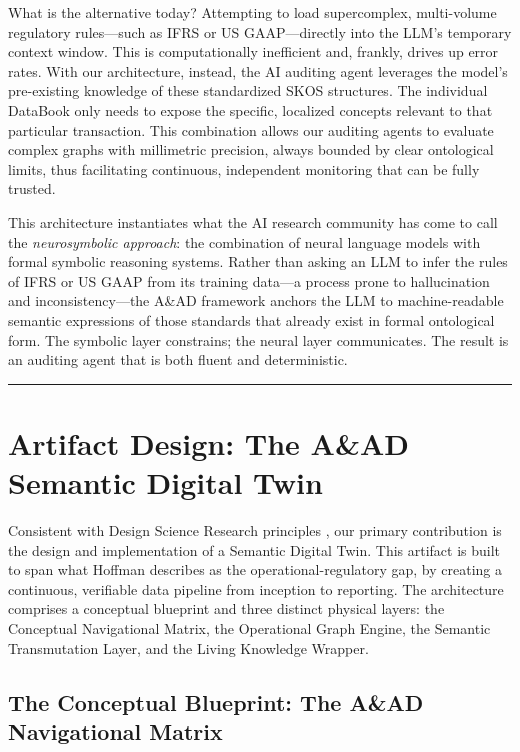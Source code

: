 \documentclass[12pt, a4paper]{article}
\begin{document}
What is the alternative today? Attempting to load supercomplex, multi-volume regulatory rules---such as IFRS or US GAAP---directly into the LLM's temporary context window. This is computationally inefficient and, frankly, drives up error rates. With our architecture, instead, the AI auditing agent leverages the model's pre-existing knowledge of these standardized SKOS structures. The individual DataBook only needs to expose the specific, localized concepts relevant to that particular transaction. This combination allows our auditing agents to evaluate complex graphs with millimetric precision, always bounded by clear ontological limits, thus facilitating continuous, independent monitoring that can be fully trusted.

This architecture instantiates what the AI research community has come to call the \textit{neurosymbolic approach}: the combination of neural language models with formal symbolic reasoning systems. Rather than asking an LLM to infer the rules of IFRS or US GAAP from its training data---a process prone to hallucination and inconsistency---the A\&AD framework anchors the LLM to machine-readable semantic expressions of those standards that already exist in formal ontological form. The symbolic layer constrains; the neural layer communicates. The result is an auditing agent that is both fluent and deterministic.

\hrule
\vspace{1em}

\section{Artifact Design: The A\&AD Semantic Digital Twin}

Consistent with Design Science Research principles \cite{hevner2004}, our primary contribution is the design and implementation of a Semantic Digital Twin. This artifact is built to span what Hoffman \cite{hoffman2025} describes as the operational-regulatory gap, by creating a continuous, verifiable data pipeline from inception to reporting. The architecture comprises a conceptual blueprint and three distinct physical layers: the Conceptual Navigational Matrix, the Operational Graph Engine, the Semantic Transmutation Layer, and the Living Knowledge Wrapper.

\subsection{The Conceptual Blueprint: The A\&AD Navigational Matrix}
\end{document}
